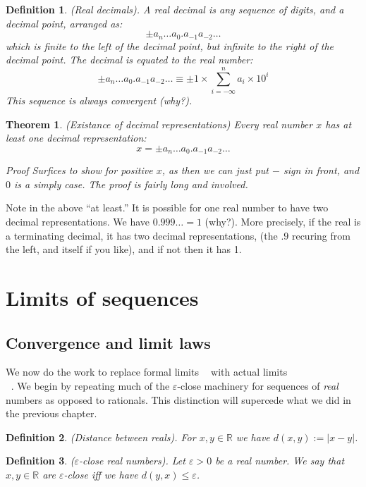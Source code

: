 \documentclass{article}
\newtheorem{definition}{Definition}[subsection]
\newtheorem{theorem}{Theorem}[subsection]
\newcommand{\R}{\mathbb{R}}
\newcommand{\vep}{\varepsilon} %
\DeclareMathOperator{\infLIM}{\mathrm{LIM}_{n \to \infty}}
\DeclareMathOperator{\inflim}{\lim_{n \to \infty}}
\let\it\textit
\begin{document}
\begin{definition}
	(Real decimals). A real decimal is 
	any sequence of digits, and a decimal
	point, arranged as:
	$$
	\pm a_n \dots a_0.a_{-1}a_{-2}\dots 
	$$
	which is finite to the left of the decimal 
	point, but infinite to the right of 
	the decimal point. The decimal is 
	equated to the real number: 
	$$
	\pm a_n \dots a_0.a_{-1}a_{-2}\dots  \equiv 
	\pm 1 \times \sum_{i = -\infty}^n a_i \times 10^i
	$$
	This sequence is always convergent (why?).
\end{definition}

\begin{theorem}
	(Existance of decimal representations) Every 
	real number $x$ has at least one 
	decimal representation:
	$$
	x = 
	\pm a_n \dots a_0.a_{-1}a_{-2}\dots  
	$$

	\it{Proof}  Surfices to show 
	for positive $x$, as then we can just
	put $-$ sign in front, and $0$ is 
	a simply case. The proof is fairly 
	long and involved.
\end{theorem}

Note in the above ``at least.'' It is possible for 
one real number to have two decimal representations. 
We have $0.999\dots = 1$ (why?). More precisely, 
if the real is a terminating decimal, it has 
two decimal representations, (the $.9$ recuring 
from the left, and itself if you like), and 
if not then it has 1. 


\newpage 
\section{Limits of sequences}


\subsection{Convergence and limit laws}

We now do the work to replace formal 
limits $\infLIM$ with actual limits \\
$\inflim$. We begin by repeating 
much of the $\vep$-close machinery 
for sequences of \it{real} numbers 
as opposed to rationals. This 
distinction will supercede what we did in the previous 
chapter. 

\begin{definition}
	(Distance between reals). For $x,y \in \R$ 
	we have $d(x,y) := |x-y|$.
\end{definition}

\begin{definition}
	($\vep$-close real numbers). Let $\vep > 0$ be 
	a real number. We say that $x,y \in\R$ are 
	$\vep$-close iff we have $d(y,x)\leq \vep$.
\end{definition}
\end{document}
